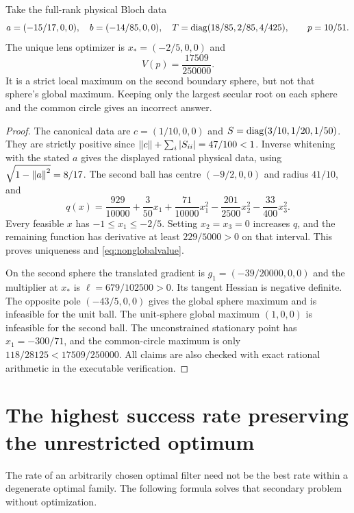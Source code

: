 \begin{proposition}
\label{prop:nonglobal}
Take the full-rank physical Bloch data
\[
 a=(-15/17,0,0),\quad b=(-14/85,0,0),\quad
 T=\operatorname{diag}(18/85,2/85,4/425),\qquad p=10/51.
\]
The unique lens optimizer is $x_*=(-2/5,0,0)$ and
\begin{equation}\label{eq:nonglobalvalue}
 V(p)=\frac{17509}{250000}.
\end{equation}
It is a strict local maximum on the second boundary sphere, but not that
sphere's global maximum. Keeping only the largest secular root on each
sphere and the common circle gives an incorrect answer.
\end{proposition}
\begin{proof}
The canonical data are $c=(1/10,0,0)$ and
$S=\operatorname{diag}(3/10,1/20,1/50)$. They are strictly positive since
$\left\lVert c\right\rVert+\sum_i|S_{ii}|=47/100<1$. Inverse whitening with the stated
$a$ gives the displayed rational physical data, using
$\sqrt{1-\left\lVert a\right\rVert^2}=8/17$. The second ball has centre $(-9/2,0,0)$
and radius $41/10$, and
\[
 q(x)=\frac{929}{10000}+\frac3{50}x_1+\frac{71}{10000}x_1^2
       -\frac{201}{2500}x_2^2-\frac{33}{400}x_3^2.
\]
Every feasible $x$ has $-1\leq x_1\leq-2/5$. Setting $x_2=x_3=0$
increases $q$, and the remaining function has derivative at least
$229/5000>0$ on that interval. This proves uniqueness and
\eqref{eq:nonglobalvalue}.

On the second sphere the translated gradient is
$g_1=(-39/20000,0,0)$ and the multiplier at $x_*$ is
$\ell=679/102500>0$. Its tangent Hessian is negative definite.
The opposite pole $(-43/5,0,0)$ gives the global sphere maximum and
is infeasible for the unit ball. The unit-sphere global maximum
$(1,0,0)$ is infeasible for the second ball. The unconstrained stationary
point has $x_1=-300/71$, and the common-circle maximum is only
$118/28125<17509/250000$. All claims are also checked with exact
rational arithmetic in the executable verification.
\end{proof}

\section{The highest success rate preserving the unrestricted optimum}
\label{sec:bestrate}

The rate of an arbitrarily chosen optimal filter need not be the best rate
within a degenerate optimal family. The following formula solves that
secondary problem without optimization.

